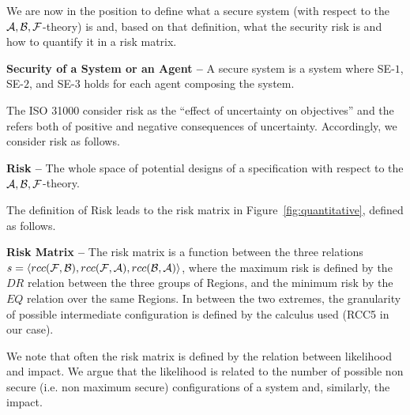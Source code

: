 We are now in the position to define what a secure system (with respect to the $\mathcal{A},\mathcal{B},\mathcal{F}$-theory) is
and, based on that definition, what the security risk is and how to quantify it in a risk matrix.
\begin{definition}{\bf Security of a System or an Agent --}\label{def:security}
	A secure system is a system where SE-$1$, SE-$2$, and SE-$3$ holds for each 
	agent composing the system.
\end{definition}
The ISO 31000 consider risk as the ``effect of uncertainty on objectives'' and the refers
both of positive and negative consequences of uncertainty. Accordingly, we consider
risk as follows. 
\begin{definition}{\bf Risk --}
The whole space of potential designs of a specification with respect to the
$\mathcal{A},\mathcal{B},\mathcal{F}$-theory.
\end{definition}
The definition of Risk leads to the risk matrix in Figure~\autoref{fig:quantitative}, defined as follows.
\begin{definition}{\bf Risk Matrix --}
	The risk matrix is a function between the three relations 
	$s=\langle rcc(\mathcal{F},\mathcal{B}),rcc(\mathcal{F},\mathcal{A}),rcc(\mathcal{B},\mathcal{A})\rangle$,
	where the maximum risk is defined by the $DR$ relation between the three groups of Regions, and the 
	minimum risk by the $EQ$ relation over the same Regions. In between the two extremes, the granularity
	of possible intermediate configuration is defined by the calculus used (RCC5 in our case).
\end{definition}
We note that often the risk matrix is defined by the relation between likelihood and impact.
We argue that the likelihood is related to the number of possible non secure (i.e. non maximum secure) 
configurations of a system and, similarly, the impact.

